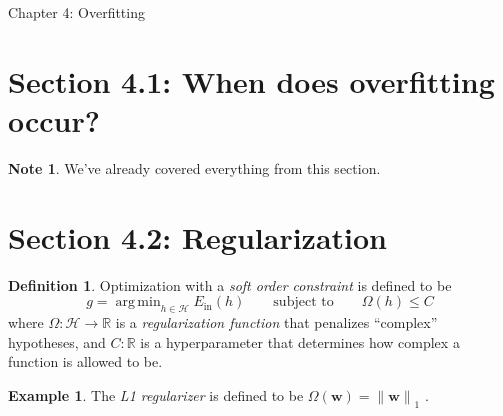 \documentclass[10pt]{exam}
\theoremstyle{definition}
\newtheorem{note}{Note}
\newtheorem{example}{Example}
\newtheorem{defn}{Definition}
\newcommand{\R}{\mathbb R}
\DeclareMathOperator*{\argmin}{arg\,min}
\newcommand{\Ein}{E_{\text{in}}}
\newcommand{\Eout}{E_{\text{out}}}
\newcommand{\w}{\mathbf w}
\newcommand{\lone}[1]{{\lVert {#1} \rVert}_1}
\begin{document}
\begin{center}
{
\Huge
Chapter 4: Overfitting
}
\end{center}

\section*{Section 4.1: When does overfitting occur?}
\begin{note}
    We've already covered everything from this section.
\end{note}

\section*{Section 4.2: Regularization}


\begin{defn}
Optimization with a \emph{soft order constraint} is defined to be
\begin{equation}
    \label{eq:soc}
    g = \argmin_{h\in\mathcal H} \Ein(h) \qquad \text{subject to}\qquad \Omega(h) \le C
\end{equation}
where $\Omega : \mathcal H \to \R$ is a \emph{regularization function} that penalizes ``complex'' hypotheses,
    and $C : \R$ is a hyperparameter that determines how complex a function is allowed to be.
\end{defn}

\vspace{5in}
\begin{example}
    The \emph{L1 regularizer} is defined to be
    $
        \Omega(\w) = \lone{\w}
    $
        .
\end{example}
\end{document}
